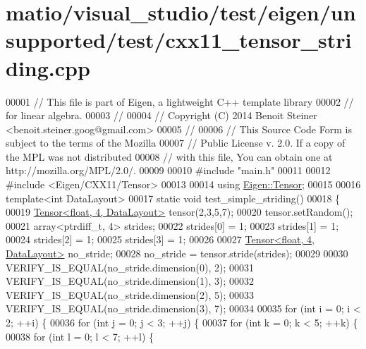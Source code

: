 \hypertarget{matio_2visual__studio_2test_2eigen_2unsupported_2test_2cxx11__tensor__striding_8cpp_source}{}\section{matio/visual\+\_\+studio/test/eigen/unsupported/test/cxx11\+\_\+tensor\+\_\+striding.cpp}
\label{matio_2visual__studio_2test_2eigen_2unsupported_2test_2cxx11__tensor__striding_8cpp_source}

\begin{DoxyCode}
00001 \textcolor{comment}{// This file is part of Eigen, a lightweight C++ template library}
00002 \textcolor{comment}{// for linear algebra.}
00003 \textcolor{comment}{//}
00004 \textcolor{comment}{// Copyright (C) 2014 Benoit Steiner <benoit.steiner.goog@gmail.com>}
00005 \textcolor{comment}{//}
00006 \textcolor{comment}{// This Source Code Form is subject to the terms of the Mozilla}
00007 \textcolor{comment}{// Public License v. 2.0. If a copy of the MPL was not distributed}
00008 \textcolor{comment}{// with this file, You can obtain one at http://mozilla.org/MPL/2.0/.}
00009 
00010 \textcolor{preprocessor}{#include "main.h"}
00011 
00012 \textcolor{preprocessor}{#include <Eigen/CXX11/Tensor>}
00013 
00014 \textcolor{keyword}{using} \hyperlink{class_eigen_1_1_tensor}{Eigen::Tensor};
00015 
00016 \textcolor{keyword}{template}<\textcolor{keywordtype}{int} DataLayout>
00017 \textcolor{keyword}{static} \textcolor{keywordtype}{void} test\_simple\_striding()
00018 \{
00019   \hyperlink{class_eigen_1_1_tensor}{Tensor<float, 4, DataLayout>} tensor(2,3,5,7);
00020   tensor.setRandom();
00021   array<ptrdiff\_t, 4> strides;
00022   strides[0] = 1;
00023   strides[1] = 1;
00024   strides[2] = 1;
00025   strides[3] = 1;
00026 
00027   \hyperlink{class_eigen_1_1_tensor}{Tensor<float, 4, DataLayout>} no\_stride;
00028   no\_stride = tensor.stride(strides);
00029 
00030   VERIFY\_IS\_EQUAL(no\_stride.dimension(0), 2);
00031   VERIFY\_IS\_EQUAL(no\_stride.dimension(1), 3);
00032   VERIFY\_IS\_EQUAL(no\_stride.dimension(2), 5);
00033   VERIFY\_IS\_EQUAL(no\_stride.dimension(3), 7);
00034 
00035   \textcolor{keywordflow}{for} (\textcolor{keywordtype}{int} i = 0; i < 2; ++i) \{
00036     \textcolor{keywordflow}{for} (\textcolor{keywordtype}{int} j = 0; j < 3; ++j) \{
00037       \textcolor{keywordflow}{for} (\textcolor{keywordtype}{int} k = 0; k < 5; ++k) \{
00038         \textcolor{keywordflow}{for} (\textcolor{keywordtype}{int} l = 0; l < 7; ++l) \{

\end{DoxyCode}
